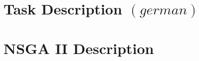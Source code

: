 \documentclass[./\jobname.tex]{subfiles}
\begin{document}
\chapter{Task Description $\left( german \right) $}


\chapter{NSGA II Description}

\end{document}
